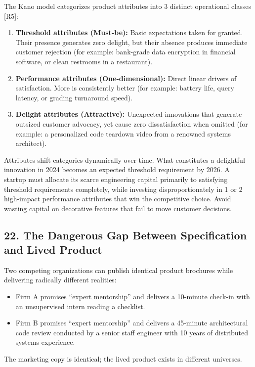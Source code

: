 The Kano model categorizes product attributes into 3 distinct operational classes [R5]:
\begin{enumerate}
    \item \textbf{Threshold attributes (Must-be):} Basic expectations taken for granted. Their presence generates zero delight, but their absence produces immediate customer rejection (for example: bank-grade data encryption in financial software, or clean restrooms in a restaurant).
    \item \textbf{Performance attributes (One-dimensional):} Direct linear drivers of satisfaction. More is consistently better (for example: battery life, query latency, or grading turnaround speed).
    \item \textbf{Delight attributes (Attractive):} Unexpected innovations that generate outsized customer advocacy, yet cause zero dissatisfaction when omitted (for example: a personalized code teardown video from a renowned systems architect).
\end{enumerate}

Attributes shift categories dynamically over time. What constitutes a delightful innovation in 2024 becomes an expected threshold requirement by 2026. A startup must allocate its scarce engineering capital primarily to satisfying threshold requirements completely, while investing disproportionately in 1 or 2 high-impact performance attributes that win the competitive choice. Avoid wasting capital on decorative features that fail to move customer decisions.

\subsection*{22. The Dangerous Gap Between Specification and Lived Product}

Two competing organizations can publish identical product brochures while delivering radically different realities:
\begin{itemize}
    \item Firm A promises ``expert mentorship'' and delivers a 10-minute check-in with an unsupervised intern reading a checklist.
    \item Firm B promises ``expert mentorship'' and delivers a 45-minute architectural code review conducted by a senior staff engineer with 10 years of distributed systems experience.
\end{itemize}

The marketing copy is identical; the lived product exists in different universes.

